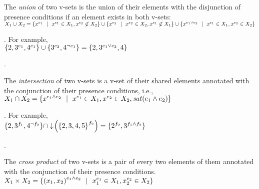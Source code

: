 %
\begin{definition}
\label{def:vset-union}
The \emph {union} of two v-sets is the union of their elements with the disjunction of 
presence conditions if an element exists in both v-sets:\\
\ensuremath{
\vset_1 \cup \vset_2 = \setDef {\annot [\dimMeta_1] \elem \myOR \annot [\dimMeta_1] \elem \in \vset_1, \annot [\dimMeta_2] \elem \not \in \vset_2}
\cup \setDef {\annot [\dimMeta_2] \elem \myOR \annot [\dimMeta_2] \elem \in \vset_2, \annot [\dimMeta_1] \elem  \not \in \vset_1}
\cup \setDef {\annot [\dimMeta_1 \vee \dimMeta_2] \elem \myOR 
\annot [\dimMeta_1] \elem \in \vset_1, \annot [\dimMeta_2] \elem \in \vset_2}
}

.
For example, \\
\ensuremath{
\setDef {2,\annot [\dimMeta_1] 3, \annot [\dimMeta_1] 4} \cup \setDef {\annot [\dimMeta_2] 3, \annot [\neg \dimMeta_1] 4} = \setDef {2, \annot [\dimMeta_1 \vee \dimMeta_2] 3, 4}
}

.
\end{definition}

% 
\begin{definition}
\label{def:vset-intersect}
The \emph{intersection} of two v-sets is a v-set of their shared elements
annotated with the conjunction of their presence conditions, i.e., \\
\ensuremath{
\vset_1 \cap \vset_2 = \setDef {
\annot [\dimMeta_1 \wedge \dimMeta_2 ]\elem \myOR
\annot [\dimMeta_1] \elem \in \vset_1, \annot [\dimMeta_2] \elem \in \vset_2,
\sat {\dimMeta_1 \wedge \dimMeta_2}
}
}

.
For example,\\
 \ensuremath{
\setDef {2, \annot [\A] 3, \annot [\neg \B] 4} \cap
\pushIn {\annot [\B] {\setDef{2,3,4,5}}} =
\setDef{\annot [\B] 2, \annot [\A \wedge \B] 3}
}

.
\end{definition}

\begin{definition} 
\label{def:vset-cross}
The \emph{cross product} of two v-sets is a pair of every two elements of 
them annotated with the conjunction of their presence conditions.\\
\ensuremath{
\vset_1 \times \vset_2 = \setDef{
\annot [\dimMeta_1 \wedge \dimMeta_2] {(\elem_1, \elem_2)} \myOR
\annot [\dimMeta_1] \elem_1 \in \vset_1, \annot [\dimMeta_2] \elem_2 \in \vset_2
}
}
%
\end{definition}

